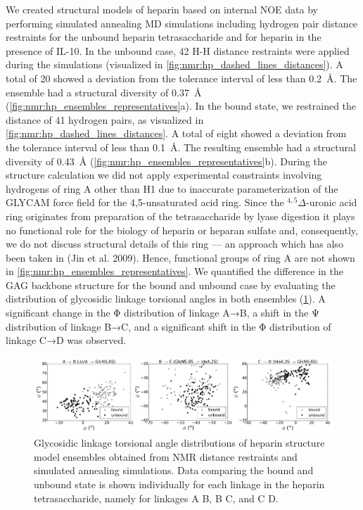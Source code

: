 We created structural models of heparin based on internal NOE data by performing
simulated annealing MD simulations including hydrogen pair distance restraints
for the unbound heparin tetrasaccharide and for heparin in the presence of
IL-10. In the unbound case, 42 H-H distance restraints were applied during the
simulations (visualized in \cref{fig:nmr:hp_dashed_lines_distances}). A total of
20 showed a deviation from the tolerance interval of less than
\SI{0.2}{\angstrom}. The ensemble had a structural diversity of
\SI{0.37}{\angstrom} (\cref{fig:nmr:hp_ensembles_representatives}a). In the
bound state, we restrained the distance of 41 hydrogen pairs, as visualized in
\cref{fig:nmr:hp_dashed_lines_distances}. A total of eight showed a deviation
from the tolerance interval of less than \SI{0.1}{\angstrom}. The resulting
ensemble had a structural diversity of \SI{0.43}{\angstrom}
(\cref{fig:nmr:hp_ensembles_representatives}b). During the structure calculation
we did not apply experimental constraints involving hydrogens of ring A other
than H1 due to inaccurate parameterization of the GLYCAM force field for the
4,5-unsaturated acid ring. Since the ${}^{4,5}\Delta$-uronic acid ring
originates from preparation of the tetrasaccharide by lyase digestion it plays
no functional role for the biology of heparin or heparan sulfate and,
consequently, we do not discuss structural details of this ring --- an approach
which has also been taken in (Jin et al. 2009). Hence, functional groups of ring
A are not shown in \cref{fig:nmr:hp_ensembles_representatives}. We quantified
the difference in the GAG backbone structure for the bound and unbound case by
evaluating the distribution of glycosidic linkage torsional angles in both
ensembles (\cref{fig:nmr:hp_glyco_dihedral_distributions}). A significant change
in the Φ distribution of linkage A→B, a shift in the Ψ distribution of linkage
B→C, and a significant shift in the Φ distribution of linkage C→D was
observed.


\begin{figure}
\begin{adjustwidth}{-2cm}{-2cm}
\centering
\includegraphics[width=1.3\textwidth]{gfx/nmr/Figure_08_glycolinkage_dihedrals_bound_vs_free_three_3panels_05.png}
\caption[]{
Glycosidic linkage torsional angle distributions of heparin structure model
ensembles obtained from NMR distance restraints and simulated annealing
simulations. Data comparing the bound and unbound state is shown individually
for each linkage in the heparin tetrasaccharide, namely for linkages A
\rightarrow B, B \rightarrow C, and C \rightarrow D.
}
\label{fig:nmr:hp_glyco_dihedral_distributions}
\end{adjustwidth}
\end{figure}

